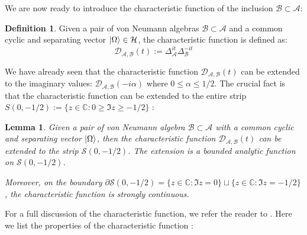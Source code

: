 \documentclass[a4paper,11pt]{article}
\newtheorem{lemma}[theorem]{Lemma}
\theoremstyle{definition}
\newtheorem{definition}{Definition}[section]
\begin{document}
We are now ready to introduce the characteristic function of the inclusion $\mathcal{B}\subset\mathcal{A}$\cite{revolutionizing}:
\begin{definition}
    Given a pair of von Neumann algebras $\mathcal{B}\subset\mathcal{A}$ and a common cyclic and separating vector $\ket{\Omega}\in\mathcal{H}$, the characteristic function is defined as:
    \begin{equation}
        \mathcal{D}_{\mathcal{A}, \mathcal{B}}(t) := \Delta_\mathcal{A}^{it}\Delta_\mathcal{B}^{-it}
    \end{equation}
\end{definition}
We have already seen that the characteristic function $\mathcal{D}_{\mathcal{A}, \mathcal{B}}(t)$ can be extended to the imaginary values: $\mathcal{D}_{\mathcal{A}, \mathcal{B}}(-i\alpha)$ where $0\leq \alpha\leq 1/2$. The crucial fact is that the characteristic function can be extended to the entire strip $S(0, -1/2) := \{z\in\mathbb{C}: 0\geq \Im{z}\geq -1/2\}$ \cite{revolutionizing}:
\begin{lemma}
    Given a pair of von Neumann algebra $\mathcal{B}\subset\mathcal{A}$ with a common cyclic and separating vector $\ket{\Omega}$, then the characteristic function $\mathcal{D}_{\mathcal{A}, \mathcal{B}}(t)$ can be extended to the strip $\mathcal{S}(0, -1/2)$. The extension is a bounded analytic function on $\mathcal{S}(0,-1/2)$.

    Moreover, on the boundary $\partial\mathcal{S}(0,-1/2) = \{z\in\mathbb{C}:\Im{z} = 0\}\sqcup\{z\in\mathbb{C}:\Im{z} = -1/2\}$, the characteristic function is strongly continuous.
\end{lemma}
For a full discussion of the characteristic function, we refer the reader to \cite{revolutionizing}. Here we list the properties of the characteristic function \cite{revolutionizing}:
\end{document}
